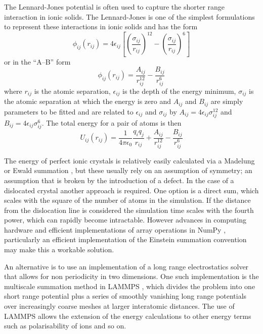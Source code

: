 The Lennard-Jones potential is often used to capture the shorter range interaction in ionic solids. The Lennard-Jones is one of the simplest formulations to represent these interactions in ionic solids and has the form
\begin{equation}
\phi_{ij}(r_{ij}) = 4\epsilon_{ij} \left[ \left( \frac{\sigma_{ij}}{r_{ij}}\right)^{12}-     \left( \frac{\sigma_{ij}}{r_{ij}}\right)^6   \right]
\end{equation}
or in the ``A--B'' form
\begin{equation}
\phi_{ij}(r_{ij}) = \frac{A_{ij}}{r_{ij}^{12}} - \frac{B_{ij}}{r_{ij}^{6}}
\end{equation}
where $r_{ij}$ is the atomic separation, $\epsilon_{ij}$ is the depth of the energy minimum, $\sigma_{ij}$ is the atomic separation at which the energy is zero and $A_{ij}$ and $B_{ij}$ are simply parameters to be fitted and are related to $\epsilon_{ij}$ and $\sigma_{ij}$ by $A_{ij} = 4\epsilon_{ij}\sigma_{ij}^{12}$ and $B_{ij} = 4 \epsilon_{ij} \sigma_{ij}^{6}$. The total energy for a pair of atoms is then
\begin{equation}
U_{ij}(r_{ij}) = \frac{1}{4\pi\epsilon_0} \frac{q_i q_j}{r_{ij}} + \frac{A_{ij}}{r_{ij}^{12}} - \frac{B_{ij}}{r_{ij}^{6}}
\end{equation}




The energy of perfect ionic crystals is relatively easily calculated  via a Madelung or Ewald summation \cite{madelung1918,Ewald1921}, but these usually rely on an assumption of symmetry; an assumption that is broken by the introduction of a defect. In the case of a dislocated crystal another approach is required. One option is a direct sum, which scales with the square of the number of atoms in the simulation. If the distance from the dislocation line is considered the simulation time scales with the fourth power, which can rapidly become intractable. However advances in computing hardware and efficient implementations of array operations in NumPy \cite{Numpy2011}, particularly an efficient implementation of the Einstein summation convention \cite{opt_einsum} may make this a workable solution.


An alternative is to use an implementation of a long range electrostatics solver that allows for non periodicity in two dimensions. One such implementation is the multiscale summation method in LAMMPS \cite{Hardy2009,Plimpton1995,LAMMPS_web}, which divides the problem into one short range potential plus a series of smoothly vanishing long range potentials over increasingly coarse meshes at larger interatomic distances. The use of LAMMPS allows the extension of the energy calculations to other energy terms such as polarisability of ions and so on.


